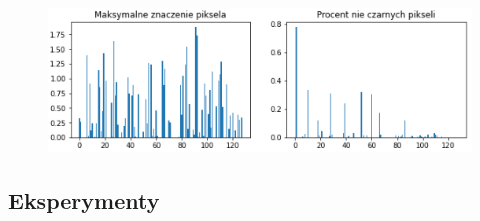 \documentclass{article}
\begin{document}
\begin{figure}[H]
	\centering
	\includegraphics[width=1\textwidth,keepaspectratio=true]{statystyka_warstwy_5}
	\caption{}
	\label{statystyka_warstwy_5}
\end{figure}
\subsection{Eksperymenty}




	
\end{document}
